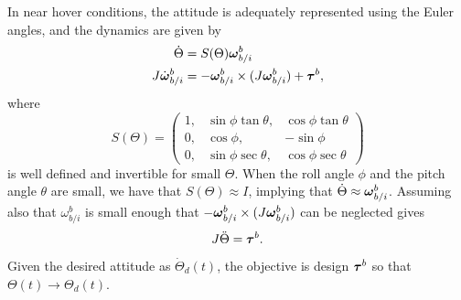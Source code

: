 In near hover conditions, the attitude is adequately represented using the Euler angles, and the dynamics are given by
\begin{align*}
	\dot{\Theta} &= S(\Theta)\boldsymbol{\omega}_{b/i}^b \\	
	J\dot{\boldsymbol{\omega}}_{b/i}^b &= -\boldsymbol{\omega}_{b/i}^b \times (J\boldsymbol{\omega}_{b/i}^b) + \boldsymbol{\tau}^b,
\end{align*}
where
\[
S(\Theta)= \begin{pmatrix} 1, & \sin\phi\tan\theta, & \cos\phi\tan\theta \\
 0, & \cos\phi, & -\sin\phi \\
 0, & \sin\phi\sec\theta, & \cos\phi\sec\theta
 \end{pmatrix}
\]
is well defined and invertible for small $\Theta$.  When the roll angle $\phi$ and the pitch angle $\theta$ are small, we have that $S(\Theta)\approx I$, implying that $\dot{\Theta}\approx \boldsymbol{\omega}_{b/i}^b$.  Assuming also that $\omega_{b/i}^b$ is small enough that $-\boldsymbol{\omega}_{b/i}^b \times (J\boldsymbol{\omega}_{b/i}^b)$ can be neglected gives
\[
J\ddot{\Theta} = \boldsymbol{\tau}^b.
\]
Given the desired attitude as $\dot{\Theta}_d(t)$, the objective is design $\boldsymbol{\tau}^b$ so that $\Theta(t)\to \Theta_d(t)$.

